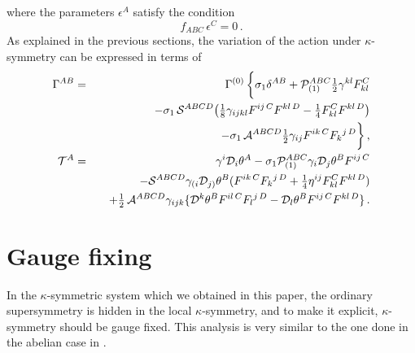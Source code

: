 \documentclass[12pt,a4paper]{article}
\def\half{{\textstyle {1 \over 2}}}
\def\quart{{\textstyle {1 \over 4}}}
\def\noverm#1#2{{\textstyle {#1 \over #2}}}
\def\Dpartial{{\cal D}}
\begin{document}
where the parameters $\epsilon^A$ satisfy the condition
\begin{equation}
   f_{ABC}\,\epsilon^C = 0\,.
\end{equation}
As explained in the previous sections,
the variation of the action  under $\kappa$-symmetry  can be expressed in
terms of
\begin{eqnarray}
  \Gamma^{AB} &=& \Gamma^{(0)}\,\bigg\{
     \sigma_1\delta^{AB}  + {\cal P}^{ABC}_{(1)} \half\gamma^{kl} {F}_{kl}^C
   \nonumber\\
  &&
   - \sigma_1 \,
    {\cal S}^{ABCD} \big( \noverm{1}{8} \gamma_{ijkl}
          F^{ij\,C} F^{kl\,D} -\quart F_{kl}^C F^{kl\,D}  \big)
       \nonumber\\
\label{Gamall}
    &&\quad  -\sigma_1\, {\cal A}^{ABCD}
           \half \gamma_{ij} F^{ik\,C} F_k{}^{j\,D} \bigg\}\,,
   \\
  {\cal T}^A &=& \gamma^i\Dpartial_i\theta^A
         - \sigma_1{\cal P}^{ABC}_{(1)} \gamma_i\Dpartial_j\theta^B F^{ij\,C}
   \nonumber\\
  &&  -{\cal S}^{ABCD}
     \gamma_{(i}\Dpartial_{j)}\theta^B
              (F^{ik\,C}F_{k}{}^{j\,D} + \quart \eta^{ij} F_{kl}^CF^{kl\,D})
    \nonumber\\
\label{Tall}
  && \quad  +\half\, {\cal A}^{ABCD}
            \gamma_{ijk}
      \{\Dpartial^k\theta^B F^{il\,C} F_l{}^{j\,D}
         - \Dpartial_l\theta^B F^{ij\,C}F^{kl\,D}\}\,.
\end{eqnarray}

\section{Gauge fixing\label{Fix}}

In the $\kappa$-symmetric system which we obtained in this paper,
the ordinary supersymmetry is hidden in the local $\kappa$-symmetry, and to
make it explicit, $\kappa$-symmetry should be gauge fixed. This analysis
is very similar to the one done in the abelian case in \cite{Aga}.
\end{document}
